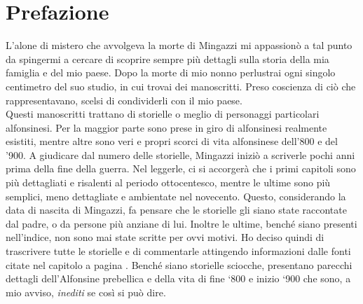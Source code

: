 \thispagestyle{empty}
\chapter*{Prefazione}
L'alone di mistero che avvolgeva la morte di Mingazzi mi appassionò a tal punto da spingermi a cercare di scoprire sempre più dettagli sulla storia della mia famiglia e del mio paese. Dopo la morte di mio nonno perlustrai ogni singolo centimetro del suo studio, in cui trovai dei manoscritti. Preso coscienza di ciò che rappresentavano, scelsi di condividerli con il mio paese.\\
\indent Questi manoscritti trattano di storielle o meglio di personaggi particolari alfonsinesi. Per la maggior parte sono prese in giro di alfonsinesi realmente esistiti, mentre altre sono veri e propri scorci di vita alfonsinese dell'800 e del '900. A giudicare dal numero delle storielle, Mingazzi iniziò a scriverle pochi anni prima della fine della guerra. Nel leggerle, ci si accorgerà che i primi capitoli sono più dettagliati e risalenti al periodo ottocentesco, mentre le ultime sono più semplici, meno dettagliate e ambientate nel novecento. Questo, considerando la data di nascita di Mingazzi, fa pensare che le storielle gli siano state raccontate dal padre, o da persone più anziane di lui. Inoltre le ultime, benché siano presenti nell'indice, non sono mai state scritte per ovvi motivi. Ho deciso quindi di trascrivere tutte le storielle e di commentarle attingendo informazioni dalle fonti citate nel capitolo \textit{ }a pagina \pageref{fonti}. Benché siano storielle sciocche, presentano parecchi dettagli dell'Alfonsine prebellica e della vita di fine `800 e inizio `900 che sono, a mio avviso, \emph{inediti} se così si può dire.\\


